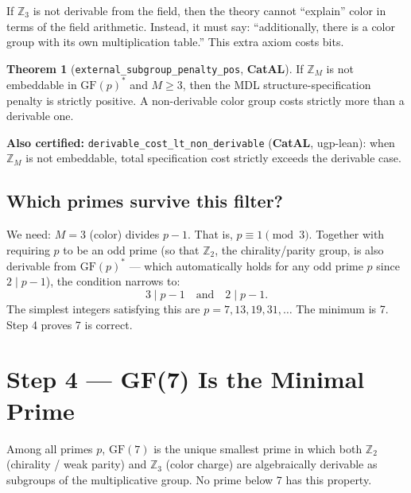 \documentclass[11pt,a4paper]{article}
\newcommand{\lean}[1]{\texttt{#1}}
\newcommand{\CatAL}{\textbf{CatAL}}
\theoremstyle{definition}
\newtheorem{theorem}{Theorem}[section]
\begin{document}
If $\mathbb{Z}_3$ is not derivable from the field, then the theory cannot
``explain'' color in terms of the field arithmetic.  Instead, it must say:
``additionally, there is a color group with its own multiplication table.''
This extra axiom costs bits.

\begin{theorem}[\lean{external\_subgroup\_penalty\_pos}, \CatAL]
If $\mathbb{Z}_M$ is not embeddable in $\mathrm{GF}(p)^*$ and $M \geq 3$,
then the MDL structure-specification penalty is strictly positive.
A non-derivable color group costs strictly more than a derivable one.
\end{theorem}

\noindent
\textbf{Also certified:}
\lean{derivable\_cost\_lt\_non\_derivable} (\CatAL, ugp-lean): when
$\mathbb{Z}_M$ is not embeddable, total specification cost strictly exceeds
the derivable case.

\subsection{Which primes survive this filter?}

We need: $M = 3$ (color) divides $p - 1$.  That is, $p \equiv 1 \pmod 3$.
Together with requiring $p$ to be an odd prime (so that $\mathbb{Z}_2$, the
chirality/parity group, is also derivable from $\mathrm{GF}(p)^*$ — which
automatically holds for any odd prime $p$ since $2 \mid p-1$), the condition
narrows to:
\[
  3 \mid p - 1 \quad \text{and} \quad 2 \mid p - 1.
\]
The simplest integers satisfying this are $p = 7, 13, 19, 31, \ldots$
The minimum is 7.  Step 4 proves 7 is correct.

\section{Step 4 — GF(7) Is the Minimal Prime}
\label{sec:step4}

\begin{tcolorbox}[colback=boxgreen,colframe=green!50!black,
  title={Step~4 claim}]
Among all primes $p$, $\mathrm{GF}(7)$ is the unique smallest prime in which
both $\mathbb{Z}_2$ (chirality / weak parity) and $\mathbb{Z}_3$ (color
charge) are algebraically derivable as subgroups of the multiplicative group.
No prime below 7 has this property.
\end{tcolorbox}
\end{document}
